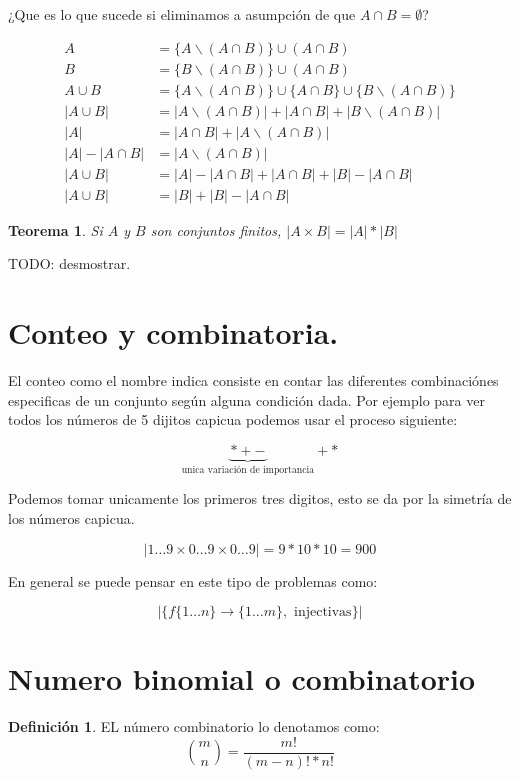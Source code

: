 \documentclass[9pt,a4paper,draft]{article}
\theoremstyle{definition}
\newtheorem{defi}{Definición}
\theoremstyle{plain}
\newtheorem{teo}{Teorema}
\begin{document}
¿Que es lo que sucede si eliminamos a asumpción de que $A\cap{B}=\emptyset$?

\begin{align*}
A          &= \{A \backslash(A\cap{B})\}\cup{(A\cap{B})}\\
B          &= \{B \backslash(A\cap{B})\}\cup{(A\cap{B})}\\
A\cup{B}   &= \{A\backslash(A\cap{B})\}\cup{\{A\cap{B}\}}\cup \{B\backslash(A\cap{B})\}\\
|A\cup{B}| &= |A\backslash(A\cap{B})| + |A\cap{B}| + |B\backslash(A\cap{B})|\\
|A|        &= |A\cap{B}| + |A\backslash(A\cap{B})|\\
|A| - |A\cap{B}| &= |A\backslash(A\cap{B})|\\
|A\cup{B}| &= |A| - |A\cap{B}| + |A\cap{B}| + |B| - |A\cap{B}|\\
|A\cup{B}| &= |B| + |B| - |A\cap{B}|
\end{align*}

\begin{teo} Si $A$ y $B$ son conjuntos finitos, $|A\times{B}| = |A|*|B|$\end{teo}
TODO: desmostrar.

\section{Conteo y combinatoria.}

El conteo como el nombre indica consiste en contar las diferentes combinaciónes especificas de un conjunto según alguna condición dada. Por ejemplo para ver todos los números de 5 dijitos capicua podemos usar el proceso siguiente:

$$\underbrace{*+-}_\text{unica variación de importancia}+*$$

Podemos tomar unicamente los primeros tres digitos, esto se da por la simetría de los números capicua.

$$|{1\dots 9}\times{0\dots 9}\times{0\dots 9}| = 9*10*10 = 900$$

En general se puede pensar en este tipo de problemas como:

$$|\{f\{1\dots n\}\to\{1\dots m\}, \text{ injectivas}\}|$$

\section{Numero binomial o combinatorio}

\begin{defi} EL número combinatorio lo denotamos como: $$\binom{m}{n}=\frac{m!}{(m-n)!*n!}$$\end{defi}
\end{document}
